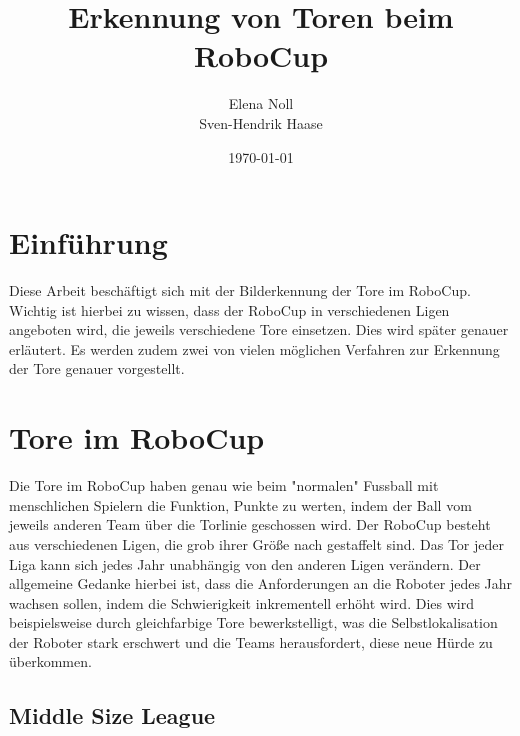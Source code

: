 \documentclass[a4paper,12pt]{article}
\begin{document}
\renewcommand\refname{Referenzen und Nachweise}

\begin{titlepage}
\author{Elena Noll\\
		Sven-Hendrik Haase}
\title{Erkennung von Toren beim RoboCup} 
\date{\today} 
\maketitle
\thispagestyle{empty}
\end{titlepage}

\tableofcontents

\newpage

\section{Einführung}
Diese Arbeit beschäftigt sich mit der Bilderkennung der Tore im RoboCup.
Wichtig ist hierbei zu wissen, dass der RoboCup in verschiedenen Ligen
angeboten wird, die jeweils verschiedene Tore einsetzen. Dies wird später
genauer erläutert. Es werden zudem zwei von vielen möglichen Verfahren zur Erkennung
der Tore genauer vorgestellt.

\section{Tore im RoboCup}
Die Tore im RoboCup haben genau wie beim "normalen" Fussball mit menschlichen
Spielern die Funktion, Punkte zu werten, indem der Ball vom jeweils anderen Team über die
Torlinie geschossen wird.
Der RoboCup besteht aus verschiedenen Ligen, die grob ihrer Größe nach
gestaffelt sind. Das Tor jeder Liga kann sich jedes Jahr unabhängig von den
anderen Ligen verändern. Der allgemeine Gedanke hierbei ist, dass die
Anforderungen an die Roboter jedes Jahr wachsen sollen, indem die Schwierigkeit
inkrementell erhöht wird. Dies wird beispielsweise durch gleichfarbige Tore
bewerkstelligt, was die Selbstlokalisation der Roboter stark erschwert und die Teams herausfordert,
diese neue Hürde zu überkommen.

\subsection{Middle Size League}
\end{document}
